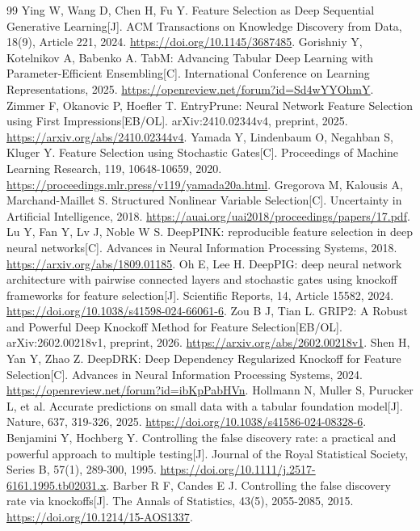\documentclass[UTF8,11pt,a4paper]{ctexart}
\begin{document}
\begin{thebibliography}{99}
 Ying W, Wang D, Chen H, Fu Y. Feature Selection as Deep Sequential Generative Learning[J]. ACM Transactions on Knowledge Discovery from Data, 18(9), Article 221, 2024. \url{https://doi.org/10.1145/3687485}.
 Gorishniy Y, Kotelnikov A, Babenko A. TabM: Advancing Tabular Deep Learning with Parameter-Efficient Ensembling[C]. International Conference on Learning Representations, 2025. \url{https://openreview.net/forum?id=Sd4wYYOhmY}.
 Zimmer F, Okanovic P, Hoefler T. EntryPrune: Neural Network Feature Selection using First Impressions[EB/OL]. arXiv:2410.02344v4, preprint, 2025. \url{https://arxiv.org/abs/2410.02344v4}.
 Yamada Y, Lindenbaum O, Negahban S, Kluger Y. Feature Selection using Stochastic Gates[C]. Proceedings of Machine Learning Research, 119, 10648-10659, 2020. \url{https://proceedings.mlr.press/v119/yamada20a.html}.
 Gregorova M, Kalousis A, Marchand-Maillet S. Structured Nonlinear Variable Selection[C]. Uncertainty in Artificial Intelligence, 2018. \url{https://auai.org/uai2018/proceedings/papers/17.pdf}.
 Lu Y, Fan Y, Lv J, Noble W S. DeepPINK: reproducible feature selection in deep neural networks[C]. Advances in Neural Information Processing Systems, 2018. \url{https://arxiv.org/abs/1809.01185}.
 Oh E, Lee H. DeepPIG: deep neural network architecture with pairwise connected layers and stochastic gates using knockoff frameworks for feature selection[J]. Scientific Reports, 14, Article 15582, 2024. \url{https://doi.org/10.1038/s41598-024-66061-6}.
 Zou B J, Tian L. GRIP2: A Robust and Powerful Deep Knockoff Method for Feature Selection[EB/OL]. arXiv:2602.00218v1, preprint, 2026. \url{https://arxiv.org/abs/2602.00218v1}.
 Shen H, Yan Y, Zhao Z. DeepDRK: Deep Dependency Regularized Knockoff for Feature Selection[C]. Advances in Neural Information Processing Systems, 2024. \url{https://openreview.net/forum?id=ibKpPabHVn}.
 Hollmann N, Muller S, Purucker L, et al. Accurate predictions on small data with a tabular foundation model[J]. Nature, 637, 319-326, 2025. \url{https://doi.org/10.1038/s41586-024-08328-6}.
 Benjamini Y, Hochberg Y. Controlling the false discovery rate: a practical and powerful approach to multiple testing[J]. Journal of the Royal Statistical Society, Series B, 57(1), 289-300, 1995. \url{https://doi.org/10.1111/j.2517-6161.1995.tb02031.x}.
 Barber R F, Candes E J. Controlling the false discovery rate via knockoffs[J]. The Annals of Statistics, 43(5), 2055-2085, 2015. \url{https://doi.org/10.1214/15-AOS1337}.

\end{thebibliography}
\end{document}
